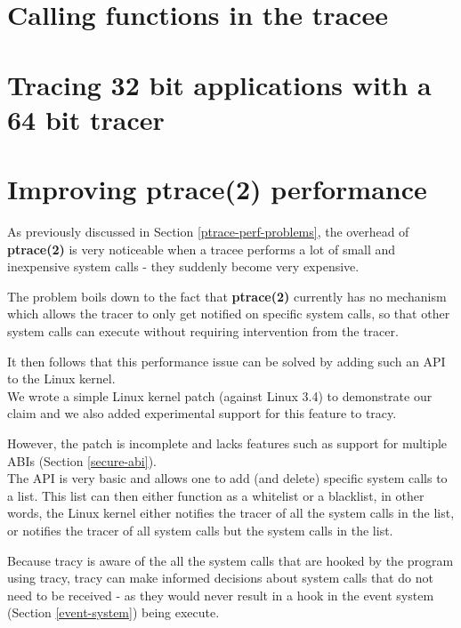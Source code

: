 \documentclass[a4paper, 10pt]{report}
\begin{document}
\section{Calling functions in the tracee}

\section{Tracing 32 bit applications with a 64 bit tracer}

\section{Improving ptrace(2) performance}
\label{ptrace-perf}

As previously discussed in Section \ref{ptrace-perf-problems}, the overhead
of \textbf{ptrace(2)} is very noticeable when a tracee performs a lot of
small and inexpensive system calls - they suddenly become very expensive.

The problem boils down to the fact that \textbf{ptrace(2)} currently
has no mechanism which allows the tracer to only get notified on specific
system calls, so that other system calls can execute without requiring
intervention from the tracer.

It then follows that this performance
issue can be solved by adding such an API to the Linux kernel. \\

We wrote a simple Linux kernel patch (against Linux 3.4) to demonstrate
our claim and we also added experimental support for this feature to tracy.

However, the patch is incomplete and lacks features such as support for
multiple ABIs (Section \ref{secure-abi}). \\

The API is very basic and allows one to add (and delete) specific system
calls to a list. This list can then either function as a whitelist or a
blacklist, in other words, the Linux kernel either notifies the tracer of
all the system calls in the list, or notifies the tracer of all system calls
but the system calls in the list.


Because tracy is aware of the all the system calls that are hooked by the
program using tracy, tracy can make informed decisions about system calls
that do not need to be received - as they would never result in a hook in
the event system (Section \ref{event-system}) being execute.
\end{document}
